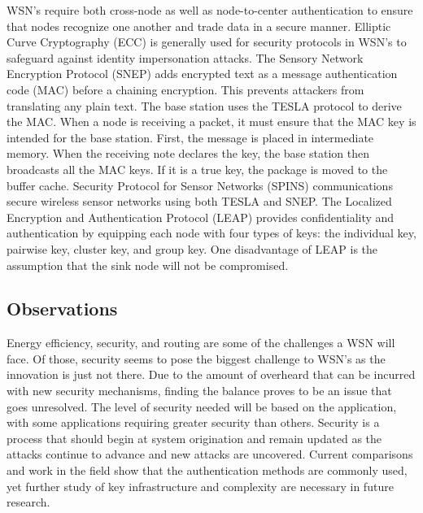 WSN’s require both cross-node as well as node-to-center authentication to ensure that nodes recognize one another and trade data in a secure manner. Elliptic Curve Cryptography (ECC) is generally used for security protocols in WSN’s to safeguard against identity impersonation attacks. The Sensory Network Encryption Protocol (SNEP) adds encrypted text as a message authentication code (MAC) before a chaining encryption. This prevents attackers from translating any plain text. The base station uses the TESLA protocol to derive the MAC. When a node is receiving a packet, it must ensure that the MAC key is intended for the base station. First, the message is placed in intermediate memory. When the receiving note declares the key, the base station then broadcasts all the MAC keys. If it is a true key, the package is moved to the buffer cache. Security Protocol for Sensor Networks (SPINS) communications secure wireless sensor networks using both TESLA and SNEP. The Localized Encryption and Authentication Protocol (LEAP) provides confidentiality and authentication by equipping each node with four types of keys: the individual key, pairwise key, cluster key, and group key. One disadvantage of LEAP is the assumption that the sink node will not be compromised. \cite {karakaya2018survey}

\subsection{Observations}
\smallskip

Energy efficiency, security, and routing are some of the challenges a WSN will face. Of those, security seems to pose the biggest challenge to WSN’s as the innovation is just not there. Due to the amount of overheard that can be incurred with new security mechanisms, finding the balance proves to be an issue that goes unresolved. The level of security needed will be based on the application, with some applications requiring greater security than others. Security is a process that should begin at system origination and remain updated as the attacks continue to advance and new attacks are uncovered. Current comparisons and work in the field show that the authentication methods are commonly used, yet further study of key infrastructure and complexity are necessary in future research.
